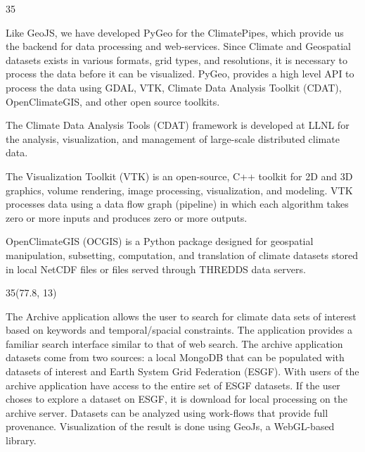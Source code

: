 \documentclass[a0,landscape]{a0poster}
\newenvironment{pcol}[1]{
  \begin{minipage}[t]{#1}
}{
  \end{minipage}
}
\begin{document}
\begin{textblock}{35}
\begin{pcol}{\threecolwidth}
\vspace{1cm}

Like GeoJS, we have developed PyGeo for the ClimatePipes, which provide us the backend for data processing and web-services. Since Climate and Geospatial datasets
exists in various formats, grid types, and resolutions, it is necessary to process the data before it can be visualized. PyGeo, provides a high level API
to process the data using GDAL, VTK, Climate Data Analysis Toolkit (CDAT), OpenClimateGIS, and other open source toolkits.

The Climate Data Analysis Tools (CDAT) framework is developed at LLNL for the analysis, visualization, and management of large-scale distributed climate data.

The Visualization Toolkit (VTK) is an open-source, C++ toolkit for 2D and 3D graphics, volume rendering, image processing, visualization, and modeling. VTK processes
data using a data flow graph (pipeline) in which each algorithm takes zero or more inputs and produces zero or more outputs.

OpenClimateGIS (OCGIS) is a Python package designed for geospatial manipulation, subsetting, computation, and translation of climate datasets stored in local
NetCDF files or files served through THREDDS data servers.

\begin{textblock}{35}(77.8, 13)
\begin{pcol}{35cm}


The Archive application allows the user to search for climate data sets of interest based on keywords and temporal/spacial constraints. The application provides a familiar
search interface similar to that of web search. The archive application datasets come from two sources: a local MongoDB that can be populated with datasets of interest and
Earth System Grid Federation (ESGF). With users of the archive application have access to the entire set of ESGF datasets. If the user choses to
explore a dataset on ESGF, it is download for local processing on the archive server. Datasets can be analyzed using work-flows that provide full provenance. Visualization of
the result is done using GeoJs, a WebGL-based library.


\end{pcol}
\end{textblock}
\end{pcol}
\end{textblock}
\end{document}
